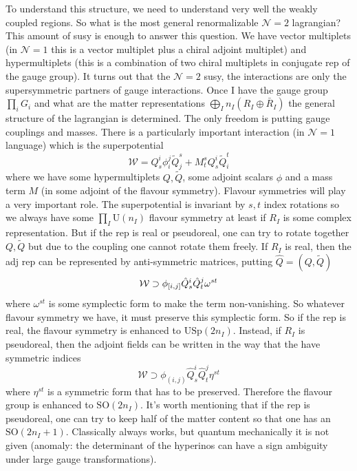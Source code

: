 \documentclass[11pt]{article}
\theoremstyle{definition}
\numberwithin{equation}{section}
\newcommand*\cN{\mathcal{N}}
\newcommand*\cW{\mathcal{W}}
\newcommand*\U{\mathrm{U}}
\newcommand*\SO{\mathrm{SO}}
\newcommand*\USp{\mathrm{USp}}
\begin{document}
To understand this structure, we need to understand very well the weakly coupled regions. So what is the most general renormalizable $\cN=2$ lagrangian?  This amount of susy is enough to answer this question. We have vector multiplets (in $\cN=1$ this is a vector multiplet plus a chiral adjoint multiplet) and hypermultiplets (this is a combination of two chiral multiplets in conjugate rep of the gauge group). It turns out that the $\cN=2$ susy, the interactions are only the supersymmetric partners of gauge interactions. Once I have the gauge group $\prod_{i}G_{i}$ and what are the matter representations $\bigoplus_{I}n_{I}(R_{I}\oplus \bar R_{I})$ the general structure of the lagrangian is determined. The only freedom is putting gauge couplings and masses. There is a particularly important interaction (in $\cN=1$ language) which is the superpotential 
\begin{equation}
	\cW=Q_{s}^{i}\phi_{i}^{j}\tilde Q_{{j}}^{s}+M_{t}^{s}Q_{s}^{i}\tilde Q_{i}^{t}
\end{equation}
where we have some hypermultiplets $Q,\tilde Q$, some adjoint scalars $\phi$ and a mass term $M$ (in some adjoint of the flavour symmetry). Flavour symmetries will play a very important role. The superpotential is invariant by $s,t$ index rotations so we always have some $\prod_{I}\U(n_{I})$ flavour symmetry at least if $R_{I}$ is some complex representation. But if the rep is real or pseudoreal, one can try to rotate together $Q,\tilde Q$ but due to the coupling one cannot rotate them freely. If $R_{I}$ is real, then the adj rep can be represented by anti-symmetric matrices, putting $\hat{Q}=(Q,\tilde Q)$
\begin{equation}
	\cW\supset \phi_{\comm{i}{j}}\hat{Q}^{i}_{s}\hat{Q}^{j}_{t}\omega^{st}
\end{equation}
where $\omega^{st}$ is some symplectic form to make the term non-vanishing. So whatever flavour symmetry we have, it must preserve this symplectic form. So if the rep is real, the flavour symmetry is enhanced to $\USp(2n_{I})$. Instead, if $R_{I}$ is pseudoreal, then the adjoint fields can be written in the way that the have symmetric indices 
\begin{equation}
	\cW\supset \phi_{(i,j)}\hat{Q}^{i}_{s}\hat{Q}^{j}_{t}\eta^{st}
\end{equation}
where $\eta^{st}$ is a symmetric form that has to be preserved. Therefore the flavour group is enhanced to $\SO(2n_{I})$. It's worth mentioning that if the rep is pseudoreal, one can try to keep half of the matter content so that one has an $\SO(2n_{I}+1)$. Classically always works, but quantum mechanically it is not given (anomaly: the determinant of the hyperinos can have a sign ambiguity under large gauge transformations).
\end{document}

